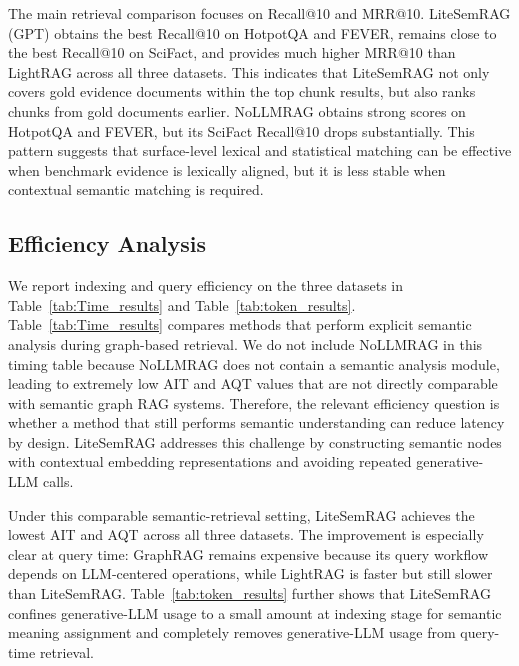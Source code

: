 \documentclass[conference]{IEEEtran}
\begin{document}
The main retrieval comparison focuses on Recall@10 and MRR@10. LiteSemRAG (GPT) obtains the best Recall@10 on HotpotQA and FEVER, remains close to the best Recall@10 on SciFact, and provides much higher MRR@10 than LightRAG across all three datasets. This indicates that LiteSemRAG not only covers gold evidence documents within the top chunk results, but also ranks chunks from gold documents earlier. NoLLMRAG obtains strong scores on HotpotQA and FEVER, but its SciFact Recall@10 drops substantially. This pattern suggests that surface-level lexical and statistical matching can be effective when benchmark evidence is lexically aligned, but it is less stable when contextual semantic matching is required.

\subsection{Efficiency Analysis}
We report indexing and query efficiency on the three datasets in Table~\ref{tab:Time_results} and Table~\ref{tab:token_results}. Table~\ref{tab:Time_results} compares methods that perform explicit semantic analysis during graph-based retrieval. We do not include NoLLMRAG in this timing table because NoLLMRAG does not contain a semantic analysis module, leading to extremely low AIT and AQT values that are not directly comparable with semantic graph RAG systems. Therefore, the relevant efficiency question is whether a method that still performs semantic understanding can reduce latency by design. LiteSemRAG addresses this challenge by constructing semantic nodes with contextual embedding representations and avoiding repeated generative-LLM calls.

Under this comparable semantic-retrieval setting, LiteSemRAG achieves the lowest AIT and AQT across all three datasets. The improvement is especially clear at query time: GraphRAG remains expensive because its query workflow depends on LLM-centered operations, while LightRAG is faster but still slower than LiteSemRAG. Table~\ref{tab:token_results} further shows that LiteSemRAG confines generative-LLM usage to a small amount at indexing stage for semantic meaning assignment and completely removes generative-LLM usage from query-time retrieval.
\end{document}
